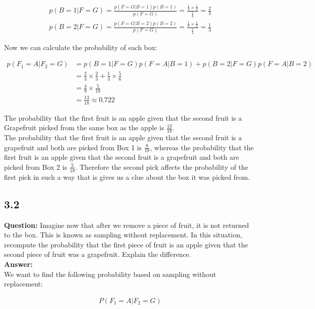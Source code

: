 \documentclass[a4paper]{article}
\begin{document}
\begin{align*}
	p(B = 1 | F = G) = \frac{p(F = G | B = 1)p(B = 1)}{p(F = G)} = \frac{\frac{1}{3} \times \frac{1}{2}}{\frac{1}{4}} = \frac{2}{3}\\
	p(B = 2 | F = G) = \frac{p(F = G | B = 2)p(B = 2)}{p(F = G)} = \frac{\frac{1}{6} \times \frac{1}{2}}{\frac{1}{4}} = \frac{1}{3}
\end{align*}

Now we can calculate the probability of each box:

\begin{align*}
	p(F_1 = A | F_2 = G) &= p(B = 1| F = G)p(F = A | B = 1) + p(B = 2 | F = G)p(F = A | B = 2)\\
	&= \frac{2}{3} \times \frac{2}{3} +  \frac{1}{3} \times \frac{5}{6}	\\
	&= \frac{4}{9} \times \frac{5}{18}\\
	&= \frac{13}{18} \approx 0.722
\end{align*}

The probability that the first fruit is an apple given that the second fruit is a Grapefruit picked from the same box as the apple is $\frac{13}{18}$.\\
The probability that the first fruit is an apple given that the second fruit is a grapefruit and both are picked from Box 1 is $\frac{8}{18}$, whereas the probability that the first fruit is an apple given that the second fruit is a grapefruit and both are picked from Box 2 is $\frac{5}{18}$. Therefore the second pick affects the probability of the first pick in such a way that is gives us a clue about the box it was picked from.

\subsection*{3.2}


\textbf{Question:} Imagine now that after we remove a piece of fruit, it is not returned to the box. This is known as sampling without replacement. In this situation, recompute the probability that the first piece of fruit is an apple given that the second piece of fruit was a grapefruit. Explain the difference.\\

\textbf{Answer:}\\

We want to find the following probability based on sampling without replacement:

\begin{align*}
	P(F_1 = A | F_2 = G)
\end{align*}
\end{document}
